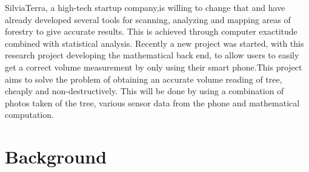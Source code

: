 SilviaTerra, a high-tech startup company,is willing to change that and have already developed several tools for scanning, analyzing and mapping areas of forestry to give accurate results. This is achieved through computer exactitude combined with statistical analysis. Recently a new project was started, with this research project developing the mathematical back end, to allow users to easily get a correct volume measurement by only using their smart phone.This project aims to solve the problem of obtaining an accurate volume reading of tree, cheaply and non-destructively. This will be done by using a combination of photos taken of the tree, various sensor data from the phone and mathematical computation.

\section{Background}

